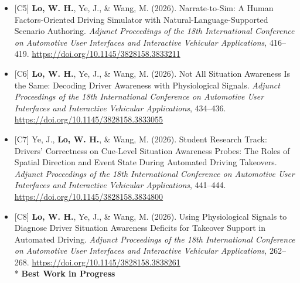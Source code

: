 \documentclass[11pt]{article}
\begin{document}
\begin{itemize}[leftmargin=*, topsep=0pt, itemsep=6pt]
  \item \begin{samepage}{[C5]} \textbf{Lo, W. H.}, Ye, J., \& Wang, M. (2026). Narrate-to-Sim: A Human Factors-Oriented Driving Simulator with Natural-Language-Supported Scenario Authoring. \textit{Adjunct Proceedings of the 18th International Conference on Automotive User Interfaces and Interactive Vehicular Applications}, 416--419. \href{https://doi.org/10.1145/3828158.3833211}{\url{https://doi.org/10.1145/3828158.3833211}}
  \par\end{samepage}

  \item \begin{samepage}{[C6]} \textbf{Lo, W. H.}, Ye, J., \& Wang, M. (2026). Not All Situation Awareness Is the Same: Decoding Driver Awareness with Physiological Signals. \textit{Adjunct Proceedings of the 18th International Conference on Automotive User Interfaces and Interactive Vehicular Applications}, 434--436. \href{https://doi.org/10.1145/3828158.3833055}{\url{https://doi.org/10.1145/3828158.3833055}}
  \par\end{samepage}

  \item \begin{samepage}{[C7]} Ye, J., \textbf{Lo, W. H.}, \& Wang, M. (2026). Student Research Track: Drivers' Correctness on Cue-Level Situation Awareness Probes: The Roles of Spatial Direction and Event State During Automated Driving Takeovers. \textit{Adjunct Proceedings of the 18th International Conference on Automotive User Interfaces and Interactive Vehicular Applications}, 441--444. \href{https://doi.org/10.1145/3828158.3834800}{\url{https://doi.org/10.1145/3828158.3834800}}
  \par\end{samepage}

  \item \begin{samepage}{[C8]} \textbf{Lo, W. H.}, Ye, J., \& Wang, M. (2026). Using Physiological Signals to Diagnose Driver Situation Awareness Deficits for Takeover Support in Automated Driving. \textit{Adjunct Proceedings of the 18th International Conference on Automotive User Interfaces and Interactive Vehicular Applications}, 262--268. \href{https://doi.org/10.1145/3828158.3838261}{\url{https://doi.org/10.1145/3828158.3838261}}\\* \textbf{Best Work in Progress}
  \par\end{samepage}


\end{itemize}
\end{document}
